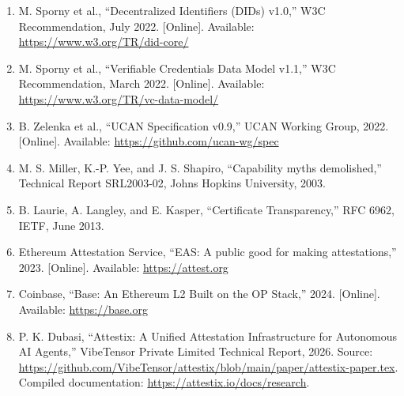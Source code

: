 \begin{enumerate}
\vspace{0.3cm}

\item M. Sporny et al., ``Decentralized Identifiers (DIDs) v1.0,'' W3C Recommendation, July 2022. [Online]. Available: \url{https://www.w3.org/TR/did-core/}

\vspace{0.3cm}

\item M. Sporny et al., ``Verifiable Credentials Data Model v1.1,'' W3C Recommendation, March 2022. [Online]. Available: \url{https://www.w3.org/TR/vc-data-model/}

\vspace{0.3cm}

\item B. Zelenka et al., ``UCAN Specification v0.9,'' UCAN Working Group, 2022. [Online]. Available: \url{https://github.com/ucan-wg/spec}

\vspace{0.3cm}

\item M. S. Miller, K.-P. Yee, and J. S. Shapiro, ``Capability myths demolished,'' Technical Report SRL2003-02, Johns Hopkins University, 2003.

\vspace{0.3cm}

\item B. Laurie, A. Langley, and E. Kasper, ``Certificate Transparency,'' RFC 6962, IETF, June 2013.

\vspace{0.3cm}

\item Ethereum Attestation Service, ``EAS: A public good for making attestations,'' 2023. [Online]. Available: \url{https://attest.org}

\vspace{0.3cm}

\item Coinbase, ``Base: An Ethereum L2 Built on the OP Stack,'' 2024. [Online]. Available: \url{https://base.org}

\vspace{0.3cm}

\item P. K. Dubasi, ``Attestix: A Unified Attestation Infrastructure for Autonomous AI Agents,'' VibeTensor Private Limited Technical Report, 2026. Source: \url{https://github.com/VibeTensor/attestix/blob/main/paper/attestix-paper.tex}. Compiled documentation: \url{https://attestix.io/docs/research}.


\end{enumerate}
